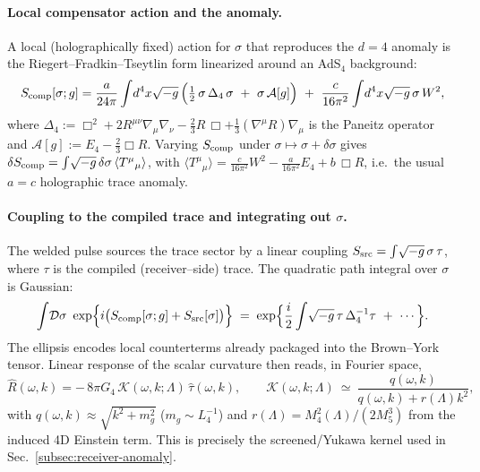\documentclass[10pt]{article}
\theoremstyle{definition}
\theoremstyle{plain}
\begin{document}
\paragraph{Local compensator action and the anomaly.}\label{par:uom-main-041}
A local (holographically fixed) action for $\sigma$ that reproduces the $d{=}4$ anomaly is
the Riegert–Fradkin–Tseytlin form \cite{Riegert1984,FradkinTseytlin1984} linearized around an AdS$_4$ background:
\begin{equation}
S_{\rm comp}[\sigma;g]
=\frac{a}{24\pi}\int\! d^4x\sqrt{-g}\,
\Big(\tfrac12\,\sigma\,\Delta_4\,\sigma\ +\ \sigma\,\mathcal A[g]\Big)
\ +\ \frac{c}{16\pi^2}\int\! d^4x\sqrt{-g}\,\sigma\,W^2,
\label{eq:comp-action}
\end{equation}
where $\Delta_4:=\Box^2+2R^{\mu\nu}\nabla_\mu\nabla_\nu-\tfrac23 R\,\Box+\tfrac13(\nabla^\mu R)\nabla_\mu$
is the Paneitz operator and
$\mathcal A[g]:=E_4-\tfrac23\Box R$.
Varying $S_{\rm comp}$ under $\sigma\mapsto \sigma+\delta\sigma$ gives
$\delta S_{\rm comp}=\int\!\sqrt{-g}\,\delta\sigma\,\langle T^\mu{}_\mu\rangle$,
with
$\langle T^\mu{}_\mu\rangle=\tfrac{c}{16\pi^2}W^2-\tfrac{a}{16\pi^2}E_4+b\,\Box R$,
i.e.\ the usual $a=c$ holographic trace anomaly.

\paragraph{Coupling to the compiled trace and integrating out $\sigma$.}\label{par:uom-main-042}
The welded pulse sources the trace sector by a linear coupling
$S_{\rm src}=\int\!\sqrt{-g}\,\sigma\,\tau$, where $\tau$ is the compiled (receiver–side) trace.
The quadratic path integral over $\sigma$ is Gaussian:
\[
\int\!\mathcal D\sigma\ \exp\!\Big\{i\big(S_{\rm comp}[\sigma;g]+S_{\rm src}[\sigma]\big)\Big\}
\;=\;\exp\!\Big\{\frac{i}{2}\int\!\sqrt{-g}\,\tau\,\Delta_4^{-1}\tau\ +\ \cdots\Big\}.
\]
The ellipsis encodes local counterterms already packaged into the Brown–York tensor.
Linear response of the scalar curvature then reads, in Fourier space,
\begin{equation}
\widehat{R}(\omega,k)
=-\,8\pi G_4\,\mathcal K(\omega,k;\Lambda)\,\widehat{\tau}(\omega,k),
\qquad
\mathcal K(\omega,k;\Lambda)\ \simeq\ \frac{q(\omega,k)}{q(\omega,k)+r(\Lambda)k^2},
\label{eq:comp-kernel}
\end{equation}
with $q(\omega,k)\!\approx\!\sqrt{k^2+m_g^2}$ ($m_g\!\sim\!L_4^{-1}$) and
$r(\Lambda)=M_4^2(\Lambda)/(2M_5^3)$ from the induced 4D Einstein term.
This is precisely the screened/Yukawa kernel used in Sec.~\ref{subsec:receiver-anomaly}.
\end{document}
